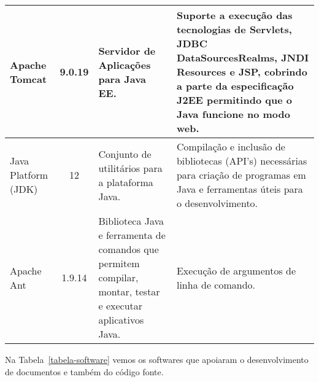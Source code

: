 \begin{table}[h]
\begin{tabular}{|p{1.6cm}|c|p{5cm}|p{6.5cm}|}
		Apache Tomcat & 9.0.19 & Servidor de Aplicações para Java EE. & Suporte a execução das tecnologias de Servlets, JDBC DataSourcesRealms, JNDI Resources e JSP, cobrindo a parte da especificação J2EE permitindo que o Java funcione no modo web. \\\hline
		
		Java Platform (JDK) & 12 & Conjunto de utilitários para a plataforma Java. & Compilação e inclusão de bibliotecas (API’s) necessárias para criação de programas em Java e ferramentas úteis para o desenvolvimento. \\\hline
		
		Apache Ant & 1.9.14 & Biblioteca Java e ferramenta de comandos que permitem compilar, montar, testar e executar aplicativos Java. & Execução de argumentos de linha de comando. \\\hline
	\end{tabular}
\end{table}







\newpage
Na Tabela~\ref{tabela-software} vemos os softwares que apoiaram o desenvolvimento de documentos e também do código fonte.

